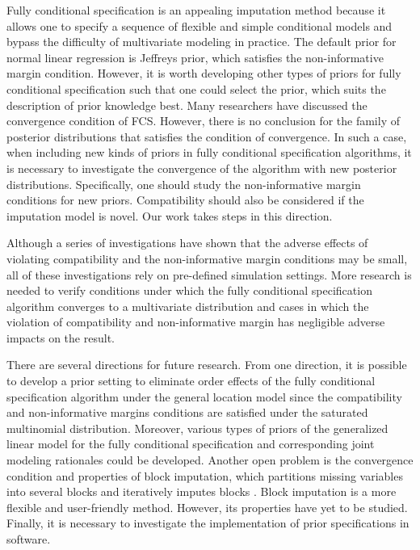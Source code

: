 	Fully conditional specification is an appealing imputation method because it allows one to specify a sequence of flexible and simple conditional models and bypass the difficulty of multivariate modeling in practice. The default prior for normal linear regression is Jeffreys prior, which satisfies the non-informative margin condition. However, it is worth developing other types of priors for fully conditional specification such that one could select the prior, which suits the description of prior knowledge best. Many researchers have discussed the convergence condition of FCS. However, there is no conclusion for the family of posterior distributions that satisfies the condition of convergence. In such a case, when including new kinds of priors in fully conditional specification algorithms, it is necessary to investigate the convergence of the algorithm with new posterior distributions. Specifically, one should study the non-informative margin conditions for new priors. Compatibility should also be considered if the imputation model is novel. Our work takes steps in this direction. 
	
	Although a series of investigations have shown that the adverse effects of violating compatibility and the non-informative margin conditions may be small, all of these investigations rely on pre-defined simulation settings. More research is needed to verify conditions under which the fully conditional specification algorithm converges to a multivariate distribution and cases in which the violation of compatibility and non-informative margin has negligible adverse impacts on the result.
	
	
	There are several directions for future research. From one direction, it is possible to develop a prior setting to eliminate order effects of the fully conditional specification algorithm under the general location model since the compatibility and non-informative margins conditions are satisfied under the saturated multinomial distribution. Moreover, various types of priors of the generalized linear model for the fully conditional specification and corresponding joint modeling rationales could be developed. Another open problem is the convergence condition and properties of block imputation, which partitions missing variables into several blocks and iteratively imputes blocks \citep[Section 4.7.2]{Buuren2018}. Block imputation is a more flexible and user-friendly method. However, its properties have yet to be studied. Finally, it is necessary to investigate the implementation of prior specifications in software.         
	
	
